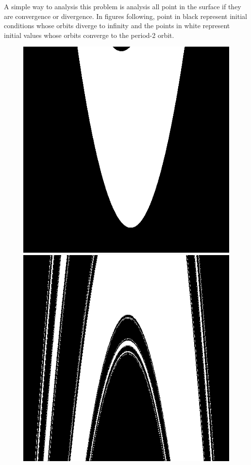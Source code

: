 \documentclass[12pt]{article}
\theoremstyle{plain}
\begin{document}
A simple way to analysis this problem is analysis all point in the surface if they are convergence or divergence. In figures following, point in black represent initial conditions whose orbits diverge to infinity and the points in white represent initial values whose orbits converge to the period-2 orbit.\\[4ex]
\begin{figure}[H]
\begin{minipage}[c][0.24\width]{0.24\textwidth}
   \centering
   \includegraphics[width=\textwidth]{figure/section2/Henon-orbit-0-0*4.png}
\end{minipage}
\begin{minipage}[c][0.24\width]{0.24\textwidth}
   \centering
   \includegraphics[width=\textwidth]{figure/section2/Henon-orbit-2--0*3.png}

\end{minipage}
\end{figure}
\end{document}

